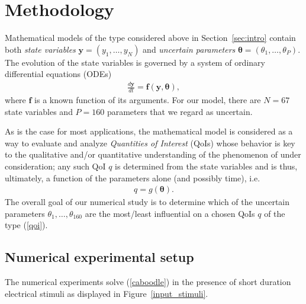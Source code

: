 \section{Methodology}\label{sec:meth}
Mathematical models of the type considered above in Section~\ref{sec:intro} contain both {\sl state variables} $\mathbf y = (y_1, \dots, y_N)$  and {\sl uncertain parameters} $\boldsymbol{\theta} = (\theta_1, \dots, \theta_P)$. The evolution of the state variables is governed by a system of ordinary differential equations (ODEs) 
\begin{eqnarray}
\frac {d\boldsymbol{y}}{dt} = \mathbf{f}(\mathbf{y}, \boldsymbol{\theta}), \label{caboodle}
\end{eqnarray}
where $\mathbf{f}$ is a known function of its arguments. For our model, there are $N = 67$ state variables and $P=160$  parameters that we regard as uncertain. 


As is the case for most applications, the mathematical model is considered as a way to evaluate and analyze {\sl Quantities of Interest} (QoIs) whose behavior is key to the qualitative and/or quantitative understanding of the phenomenon of under consideration; any such QoI $q$ is determined from the state variables and is thus, ultimately, a function of the parameters alone (and possibly time), i.e.
\begin{eqnarray}
q = g(\boldsymbol{\theta}). \label{qoi}
\end{eqnarray}
The overall goal of our numerical study is to determine  which of the uncertain parameters $\theta_1, \dots, \theta_{160}$  are the most/least influential on a chosen QoIs $q$ of the type (\ref{qoi}). 



\subsection{Numerical experimental setup}
The numerical experiments solve (\ref{caboodle}) in the presence of short duration electrical stimuli as displayed in Figure~\ref{input_stimuli}.


